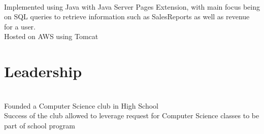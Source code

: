 \documentclass[]{Resume}
\begin{document}
\begin{minipage}[t]{0.66\textwidth}
\sectionsep

 \\
\textbullet{} Implemented using Java with Java Server Pages Extension, with main focus being on SQL queries to retrieve information such as SalesReports as well as revenue for a user. \\
\textbullet{} Hosted on AWS using Tomcat

\sectionsep


\section{Leadership}
 \\
\textbullet{} Founded a Computer Science club in High School \\
\textbullet{} Success of the club allowed to leverage request for Computer Science classes to be part of  school program 
\sectionsep

\end{minipage} 
\end{document}
